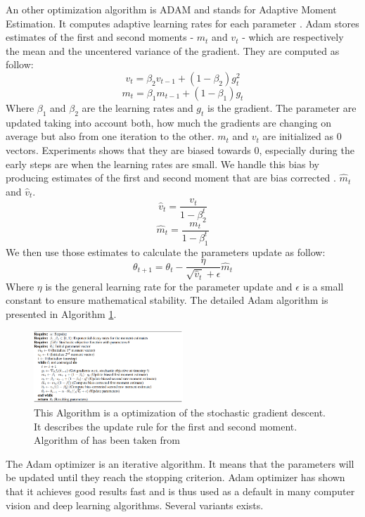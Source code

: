 An other optimization algorithm is ADAM and stands for Adaptive Moment Estimation. It computes adaptive learning rates for each parameter . Adam stores estimates of the first and second moments - \(m_t\) and \(v_t\) - which are respectively the mean and the uncentered variance of the gradient. They are computed as follow: \[ v_t = \beta_2 v_{t-1} + (1 - \beta_2)g_t^2 \] \[m_t = \beta_1 m_{t-1} + (1 - \beta_1)g_t \]
Where \(\beta_1\) and \(\beta_2\) are the learning rates and \(g_t\) is the gradient. The parameter are updated taking into account both, how much the gradients are changing on average but also from one iteration to the other.  \(m_t\) and \(v_t\) are initialized as 0 vectors. Experiments shows that they are biased towards 0, especially during the early steps are when the learning rates are small. We handle this bias by producing estimates of the first and second moment that are bias corrected \cite{adam}. \(\hat{m}_t\) and \(\hat{v}_t\). 
\[ \hat{v}_t=  \frac{v_{t}}{1 - \beta_2^t}\] 
\[\hat{m}_t=  \frac{m_{t}}{1 - \beta_1^t}\] 
We then use those estimates to calculate the parameters update as follow: \[\theta_{t+1} = \theta_t - \frac{\eta}{\sqrt{\hat{v}_t} + \epsilon}\hat{m}_t\]
Where \(\eta\) is the general learning rate for the parameter update and \(\epsilon\) is a small constant to ensure mathematical stability. 
The detailed  Adam algorithm is presented in Algorithm \ref{fig:adam_algo}.
\begin{figure}[!htp]
    \centering
        \includegraphics[width=0.5\textwidth]{figures/02-adam_algo}
        \caption[Adam Algorithm]{ This Algorithm is a optimization of the stochastic gradient descent. It describes the update rule for the first and second moment. Algorithm of has been taken from \cite{adam}}\label{fig:adam_algo}
\end{figure}
The Adam optimizer is an iterative algorithm. It means that the parameters will be updated until they reach the stopping criterion. 
Adam optimizer has shown that it achieves good results fast and is thus used as a default in many 
computer vision and deep learning algorithms. Several variants exists.

